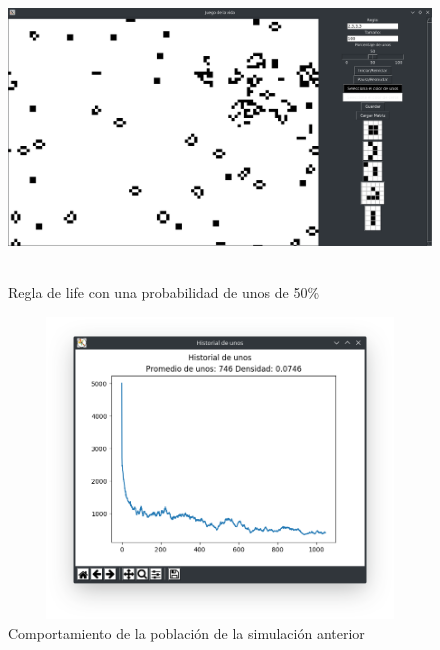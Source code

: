 \begin{figure}[H]
\begin{center}
 \includegraphics[width=12cm, height=8cm]{./img/life50.png}
 \caption{Regla de life con una probabilidad de unos de 50\%}
 \label{fig:life50}
\end{center}
\end{figure}

\begin{figure}[H]
\begin{center}
 \includegraphics[width=12cm, height=8cm]{./img/life50grafica.png}
 \caption{Comportamiento de la población de la simulación anterior}
 \label{fig:life50grafica}
\end{center}
\end{figure}

